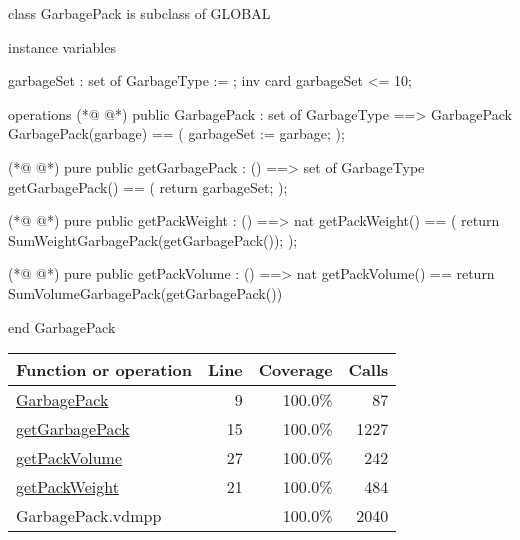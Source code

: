 \begin{vdmpp}[breaklines=true]
class GarbagePack is subclass of GLOBAL

instance variables

garbageSet : set of GarbageType := {};
inv card garbageSet <= 10;

operations
(*@
\label{GarbagePack:9}
@*)
public GarbagePack : set of GarbageType ==> GarbagePack
GarbagePack(garbage) == 
(
    garbageSet := garbage;
);

(*@
\label{getGarbagePack:15}
@*)
pure public getGarbagePack : () ==> set of GarbageType
getGarbagePack() == 
(
    return garbageSet;
);

(*@
\label{getPackWeight:21}
@*)
pure public getPackWeight : () ==> nat
getPackWeight() == 
(
    return SumWeightGarbagePack(getGarbagePack());
);

(*@
\label{getPackVolume:27}
@*)
pure public getPackVolume : () ==> nat
getPackVolume() ==
    return SumVolumeGarbagePack(getGarbagePack())

end GarbagePack
\end{vdmpp}
\bigskip
\begin{longtable}{|l|r|r|r|}
\hline
Function or operation & Line & Coverage & Calls \\
\hline
\hline
\hyperref[GarbagePack:9]{GarbagePack} & 9&100.0\% & 87 \\
\hline
\hyperref[getGarbagePack:15]{getGarbagePack} & 15&100.0\% & 1227 \\
\hline
\hyperref[getPackVolume:27]{getPackVolume} & 27&100.0\% & 242 \\
\hline
\hyperref[getPackWeight:21]{getPackWeight} & 21&100.0\% & 484 \\
\hline
\hline
GarbagePack.vdmpp & & 100.0\% & 2040 \\
\hline
\end{longtable}


